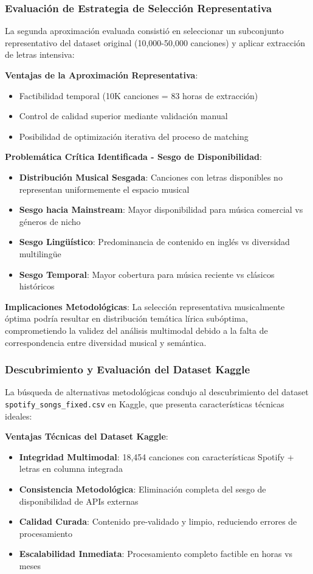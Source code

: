 \documentclass[12pt,a4paper]{report}
\begin{document}
\subsubsection{Evaluación de Estrategia de Selección Representativa}

La segunda aproximación evaluada consistió en seleccionar un subconjunto representativo del dataset original (10,000-50,000 canciones) y aplicar extracción de letras intensiva:

\textbf{Ventajas de la Aproximación Representativa}:
\begin{itemize}
\item Factibilidad temporal (10K canciones = 83 horas de extracción)
\item Control de calidad superior mediante validación manual
\item Posibilidad de optimización iterativa del proceso de matching
\end{itemize}

\textbf{Problemática Crítica Identificada - Sesgo de Disponibilidad}:
\begin{itemize}
\item \textbf{Distribución Musical Sesgada}: Canciones con letras disponibles no representan uniformemente el espacio musical
\item \textbf{Sesgo hacia Mainstream}: Mayor disponibilidad para música comercial vs géneros de nicho
\item \textbf{Sesgo Lingüístico}: Predominancia de contenido en inglés vs diversidad multilingüe
\item \textbf{Sesgo Temporal}: Mayor cobertura para música reciente vs clásicos históricos
\end{itemize}

\textbf{Implicaciones Metodológicas}:
La selección representativa musicalmente óptima podría resultar en distribución temática lírica subóptima, comprometiendo la validez del análisis multimodal debido a la falta de correspondencia entre diversidad musical y semántica.

\subsubsection{Descubrimiento y Evaluación del Dataset Kaggle}

La búsqueda de alternativas metodológicas condujo al descubrimiento del dataset \texttt{spotify\_songs\_fixed.csv} en Kaggle, que presenta características técnicas ideales:

\textbf{Ventajas Técnicas del Dataset Kaggle}:
\begin{itemize}
\item \textbf{Integridad Multimodal}: 18,454 canciones con características Spotify + letras en columna integrada
\item \textbf{Consistencia Metodológica}: Eliminación completa del sesgo de disponibilidad de APIs externas
\item \textbf{Calidad Curada}: Contenido pre-validado y limpio, reduciendo errores de procesamiento
\item \textbf{Escalabilidad Inmediata}: Procesamiento completo factible en horas vs meses
\end{itemize}
\end{document}
